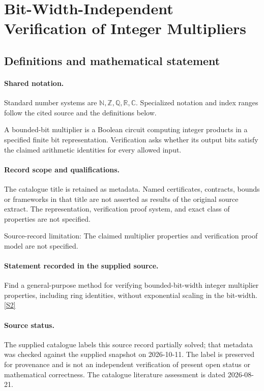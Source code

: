\documentclass[11pt]{article}
\newcommand{\sref}[2]{\hyperlink{source:#1:#2}{[S#2]}}
\begin{document}
\section{Bit-Width-Independent Verification of Integer Multipliers}\label{statement}

\subsection{Definitions and mathematical statement}

\paragraph{Shared notation.}Standard number systems are $\mathbb N,\mathbb Z,\mathbb Q,\mathbb R,\mathbb C$. Specialized notation and index ranges follow the cited source and the definitions below.


A bounded-bit multiplier is a Boolean circuit computing integer products in a specified finite bit representation. Verification asks whether its output bits satisfy the claimed arithmetic identities for every allowed input.
\paragraph{Record scope and qualifications.}
The catalogue title is retained as metadata. Named certificates, contracts, bounds or frameworks in that title are not asserted as results of the original source extract.
The representation, verification proof system, and exact class of properties are not specified.

Source-record limitation: The claimed multiplier properties and verification proof model are not specified.
\paragraph{Statement recorded in the supplied source.}
Find a general-purpose method for verifying bounded-bit-width integer multiplier properties, including ring identities, without exponential scaling in the bit-width. \sref{statement}{2}
\paragraph{Source status.}
The supplied catalogue labels this source record partially solved; that metadata was checked against the supplied snapshot on 2026-10-11. The label is preserved for provenance and is not an independent verification of present open status or mathematical correctness. The catalogue literature assessment is dated 2026-08-21.
\end{document}
